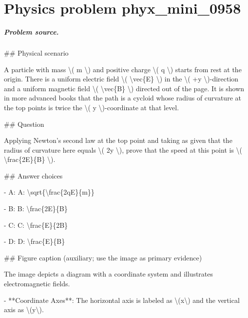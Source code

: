 
\chapter{Physics problem phyx\_mini\_0958}
\label{ch:PhyXMiniProblems_problem_phyx_mini_0958}

\paragraph{Problem source.}
\#\# Physical scenario

A particle with mass \textbackslash{}( m \textbackslash{}) and positive charge \textbackslash{}( q \textbackslash{}) starts from rest at the origin. There is a uniform electric field \textbackslash{}( \textbackslash{}vec\{E\} \textbackslash{}) in the \textbackslash{}( +y \textbackslash{})-direction and a uniform magnetic field \textbackslash{}( \textbackslash{}vec\{B\} \textbackslash{}) directed out of the page. It is shown in more advanced books that the path is a cycloid whose radius of curvature at the top points is twice the \textbackslash{}( y \textbackslash{})-coordinate at that level.

\#\# Question

Applying Newton's second law at the top point and taking as given that the radius of curvature here equals \textbackslash{}( 2y \textbackslash{}), prove that the speed at this point is \textbackslash{}( \textbackslash{}frac\{2E\}\{B\} \textbackslash{}).

\#\# Answer choices

- A: A: \textbackslash{}sqrt\{\textbackslash{}frac\{2qE\}\{m\}\}

- B: B: \textbackslash{}frac\{2E\}\{B\}

- C: C: \textbackslash{}frac\{E\}\{2B\}

- D: D: \textbackslash{}frac\{E\}\{B\}

\#\# Figure caption (auxiliary; use the image as primary evidence)

The image depicts a diagram with a coordinate system and illustrates electromagnetic fields. 

- **Coordinate Axes**: The horizontal axis is labeled as \textbackslash{}(x\textbackslash{}) and the vertical axis as \textbackslash{}(y\textbackslash{}).

